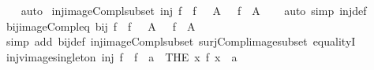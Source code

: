 \begin{isabellebody}
%
\isadelimproof
\ \ %
\endisadelimproof
%
\isatagproof
{}\isamarkupfalse%
\ auto%
\endisatagproof
{\isafoldproof}%
%
\isadelimproof
\isanewline
%
\endisadelimproof
\isanewline
{}\isamarkupfalse%
\ inj{\isacharunderscore}{\kern0pt}image{\isacharunderscore}{\kern0pt}Compl{\isacharunderscore}{\kern0pt}subset{\isacharcolon}{\kern0pt}\ {\isachardoublequoteopen}inj\ f\ {\isasymLongrightarrow}\ f\ {\isacharbackquote}{\kern0pt}\ {\isacharparenleft}{\kern0pt}{\isacharminus}{\kern0pt}\ A{\isacharparenright}{\kern0pt}\ {\isasymsubseteq}\ {\isacharminus}{\kern0pt}\ {\isacharparenleft}{\kern0pt}f\ {\isacharbackquote}{\kern0pt}\ A{\isacharparenright}{\kern0pt}{\isachardoublequoteclose}\isanewline
%
\isadelimproof
\ \ %
\endisadelimproof
%
\isatagproof
{}\isamarkupfalse%
\ {\isacharparenleft}{\kern0pt}auto\ simp{\isacharcolon}{\kern0pt}\ inj{\isacharunderscore}{\kern0pt}def{\isacharparenright}{\kern0pt}%
\endisatagproof
{\isafoldproof}%
%
\isadelimproof
\isanewline
%
\endisadelimproof
\isanewline
{}\isamarkupfalse%
\ bij{\isacharunderscore}{\kern0pt}image{\isacharunderscore}{\kern0pt}Compl{\isacharunderscore}{\kern0pt}eq{\isacharcolon}{\kern0pt}\ {\isachardoublequoteopen}bij\ f\ {\isasymLongrightarrow}\ f\ {\isacharbackquote}{\kern0pt}\ {\isacharparenleft}{\kern0pt}{\isacharminus}{\kern0pt}\ A{\isacharparenright}{\kern0pt}\ {\isacharequal}{\kern0pt}\ {\isacharminus}{\kern0pt}\ {\isacharparenleft}{\kern0pt}f\ {\isacharbackquote}{\kern0pt}\ A{\isacharparenright}{\kern0pt}{\isachardoublequoteclose}\isanewline
%
\isadelimproof
\ \ %
\endisadelimproof
%
\isatagproof
{}\isamarkupfalse%
\ {\isacharparenleft}{\kern0pt}simp\ add{\isacharcolon}{\kern0pt}\ bij{\isacharunderscore}{\kern0pt}def\ inj{\isacharunderscore}{\kern0pt}image{\isacharunderscore}{\kern0pt}Compl{\isacharunderscore}{\kern0pt}subset\ surj{\isacharunderscore}{\kern0pt}Compl{\isacharunderscore}{\kern0pt}image{\isacharunderscore}{\kern0pt}subset\ equalityI{\isacharparenright}{\kern0pt}%
\endisatagproof
{\isafoldproof}%
%
\isadelimproof
\isanewline
%
\endisadelimproof
\isanewline
{}\isamarkupfalse%
\ inj{\isacharunderscore}{\kern0pt}vimage{\isacharunderscore}{\kern0pt}singleton{\isacharcolon}{\kern0pt}\ {\isachardoublequoteopen}inj\ f\ {\isasymLongrightarrow}\ f\ {\isacharminus}{\kern0pt}{\isacharbackquote}{\kern0pt}\ {\isacharbraceleft}{\kern0pt}a{\isacharbraceright}{\kern0pt}\ {\isasymsubseteq}\ {\isacharbraceleft}{\kern0pt}THE\ x{\isachardot}{\kern0pt}\ f\ x\ {\isacharequal}{\kern0pt}\ a{\isacharbraceright}{\kern0pt}{\isachardoublequoteclose}\isanewline

\end{isabellebody}
